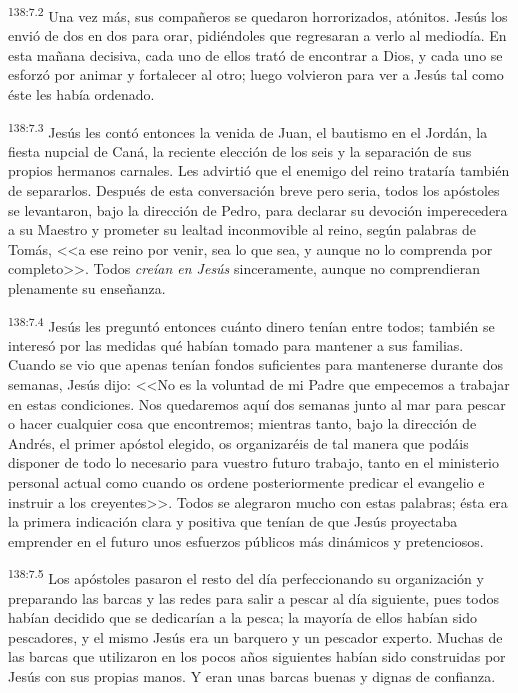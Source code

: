 \par 
\textsuperscript{138:7.2} Una vez más, sus compañeros se quedaron horrorizados, atónitos. Jesús los envió de dos en dos para orar, pidiéndoles que regresaran a verlo al mediodía. En esta mañana decisiva, cada uno de ellos trató de encontrar a Dios, y cada uno se esforzó por animar y fortalecer al otro; luego volvieron para ver a Jesús tal como éste les había ordenado.

\par 
\textsuperscript{138:7.3} Jesús les contó entonces la venida de Juan, el bautismo en el Jordán, la fiesta nupcial de Caná, la reciente elección de los seis y la separación de sus propios hermanos carnales. Les advirtió que el enemigo del reino trataría también de separarlos. Después de esta conversación breve pero seria, todos los apóstoles se levantaron, bajo la dirección de Pedro, para declarar su devoción imperecedera a su Maestro y prometer su lealtad inconmovible al reino, según palabras de Tomás, <<a ese reino por venir, sea lo que sea, y aunque no lo comprenda por completo>>. Todos \textit{creían en Jesús} sinceramente, aunque no comprendieran plenamente su enseñanza.

\par 
\textsuperscript{138:7.4} Jesús les preguntó entonces cuánto dinero tenían entre todos; también se interesó por las medidas qué habían tomado para mantener a sus familias. Cuando se vio que apenas tenían fondos suficientes para mantenerse durante dos semanas, Jesús dijo: <<No es la voluntad de mi Padre que empecemos a trabajar en estas condiciones. Nos quedaremos aquí dos semanas junto al mar para pescar o hacer cualquier cosa que encontremos; mientras tanto, bajo la dirección de Andrés, el primer apóstol elegido, os organizaréis de tal manera que podáis disponer de todo lo necesario para vuestro futuro trabajo, tanto en el ministerio personal actual como cuando os ordene posteriormente predicar el evangelio e instruir a los creyentes>>. Todos se alegraron mucho con estas palabras; ésta era la primera indicación clara y positiva que tenían de que Jesús proyectaba emprender en el futuro unos esfuerzos públicos más dinámicos y pretenciosos.

\par 
\textsuperscript{138:7.5} Los apóstoles pasaron el resto del día perfeccionando su organización y preparando las barcas y las redes para salir a pescar al día siguiente, pues todos habían decidido que se dedicarían a la pesca; la mayoría de ellos habían sido pescadores, y el mismo Jesús era un barquero y un pescador experto. Muchas de las barcas que utilizaron en los pocos años siguientes habían sido construidas por Jesús con sus propias manos. Y eran unas barcas buenas y dignas de confianza.

